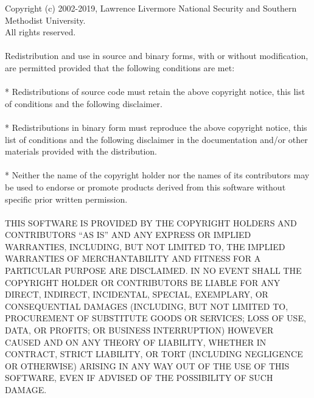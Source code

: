 Copyright (c) 2002-2019, Lawrence Livermore National Security and Southern
Methodist University.\\
All rights reserved.
\\
\\
Redistribution and use in source and binary forms, with or without
modification, are permitted provided that the following conditions are met:
\\
\\
* Redistributions of source code must retain the above copyright notice, this
  list of conditions and the following disclaimer.
\\
\\
* Redistributions in binary form must reproduce the above copyright notice,
  this list of conditions and the following disclaimer in the documentation
  and/or other materials provided with the distribution.
\\
\\
* Neither the name of the copyright holder nor the names of its
  contributors may be used to endorse or promote products derived from
  this software without specific prior written permission.
\\
\\
THIS SOFTWARE IS PROVIDED BY THE COPYRIGHT HOLDERS AND CONTRIBUTORS ``AS IS''
AND ANY EXPRESS OR IMPLIED WARRANTIES, INCLUDING, BUT NOT LIMITED TO, THE
IMPLIED WARRANTIES OF MERCHANTABILITY AND FITNESS FOR A PARTICULAR PURPOSE ARE
DISCLAIMED. IN NO EVENT SHALL THE COPYRIGHT HOLDER OR CONTRIBUTORS BE LIABLE
FOR ANY DIRECT, INDIRECT, INCIDENTAL, SPECIAL, EXEMPLARY, OR CONSEQUENTIAL
DAMAGES (INCLUDING, BUT NOT LIMITED TO, PROCUREMENT OF SUBSTITUTE GOODS OR
SERVICES; LOSS OF USE, DATA, OR PROFITS; OR BUSINESS INTERRUPTION) HOWEVER
CAUSED AND ON ANY THEORY OF LIABILITY, WHETHER IN CONTRACT, STRICT LIABILITY,
OR TORT (INCLUDING NEGLIGENCE OR OTHERWISE) ARISING IN ANY WAY OUT OF THE USE
OF THIS SOFTWARE, EVEN IF ADVISED OF THE POSSIBILITY OF SUCH DAMAGE.

